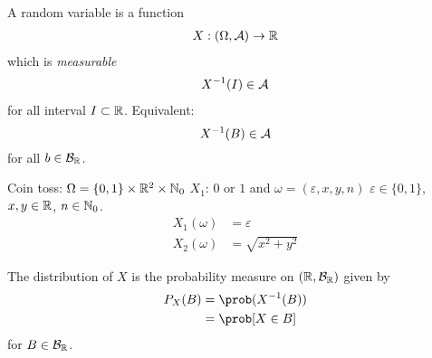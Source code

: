 \documentclass[mfit.tex]{subfiles}
\begin{document}
\begin{defi*}
  A random variable is a function
  \begin{align*}
    X: (\Omega,\mathcal{A}) \to \mathbb{R}
  \end{align*}
  which is \emph{measurable}
  \begin{align*}
    {X}^{-1}(I) \in \mathcal{A}
  \end{align*}
  for all interval $I \subset \mathbb{R}$.
  Equivalent: 
  \[ {X}^{-1}(B) \in \mathcal{A} \]
  for all $b \in \mathcal{B}_{\mathbb{R}}$.
\end{defi*}

\begin{ex}
  Coin toss: $\Omega = \{ 0,1 \} \times \mathbb{R}^2 \times \mathbb{N}_0$
  $X_1$: $0$ or $1$ and $\omega = (\varepsilon,x,y,n)$ $\varepsilon \in \{0,1\}$, $x,y \in \mathbb{R}$, $n \in \mathbb{N}_0$.
  \begin{align*}
    X_1(\omega) &= \varepsilon \\
    X_2(\omega) &= \sqrt{x^2 + y^2}
  \end{align*}
\end{ex}


The distribution of $X$ is the probability measure on $(\mathbb{R},\mathcal{B}_{\mathbb{R}})$ given by 
\begin{align*}
  P_X(B) &= \prob(\inv{X}(B)) \\
  &= \prob[X \in B]
\end{align*} 
for $B \in \mathcal{B}_{\mathbb{R}}$.
\end{document}
